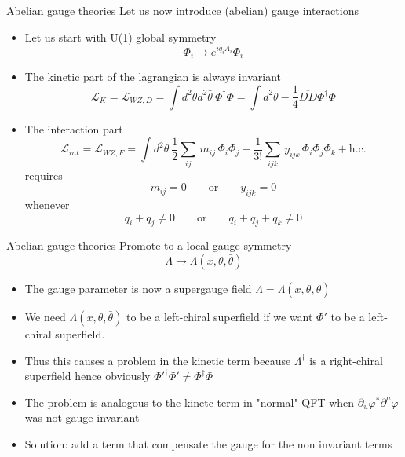 \documentclass[10pt]{beamer}
\begin{document}
\begin{frame}{Abelian gauge theories}
Let us now introduce (abelian) gauge interactions
\begin{itemize} 
    \item Let us start with U(1) global symmetry 
    \begin{equation*}
        \Phi_i \rightarrow e^{iq_i\Lambda_i}\Phi_i
    \end{equation*}
    \item The kinetic part of the lagrangian is always invariant
    \begin{equation*}
        \mathcal{L}_{K} = \mathcal{L}_{WZ,D} = \int d^2\theta d^2 \bar\theta \ \Phi^{\dagger}\Phi = \int d^2\theta -\frac{1}{4} \overline{D D} \Phi^{\dagger}\Phi
    \end{equation*}
    \item The interaction part 
    \begin{equation*}
        \mathcal{L}_{int} = \mathcal{L}_{WZ,F} = \int d^2\theta \ \frac{1}{2} \sum_{ij} \, m_{ij} \, \Phi_i \Phi_j + \frac{1}{3!} \sum_{ijk}  \, y_{ijk} \, \Phi_i \Phi_j \Phi_k + \text{h.c.}
    \end{equation*}
    requires
    \begin{equation*}
        m_{ij} = 0 \qquad \text{or} \qquad y_{ijk} = 0
    \end{equation*}
    whenever
    \begin{equation*}
        q_i + q_j \neq 0 \qquad \text{or} \qquad q_i + q_j + q_k \neq 0
    \end{equation*}
\end{itemize}
\end{frame}

\begin{frame}{Abelian gauge theories}
Promote to a local gauge symmetry
\begin{equation*}
    \Lambda \to \Lambda(x, \theta, \bar\theta)
\end{equation*}
\begin{itemize}
    \item The gauge parameter is now a supergauge field $\Lambda = \Lambda(x, \theta, \bar\theta)$
    \item We need $\Lambda(x, \theta, \bar\theta)$ to be a left-chiral superfield if we want $\Phi'$ to be a left-chiral superfield. \\ 
    \item Thus this causes a problem in the kinetic term because $\Lambda^{\dagger}$ is a right-chiral superfield
    hence obviously $\Phi'^{\dagger}\Phi' \neq \Phi^{\dagger}\Phi$
    \item The problem is analogous to the kinetc term in "normal" QFT when $\partial_u \varphi^* \partial^\mu \varphi$ was not gauge invariant
    \item Solution: add a term that compensate the gauge for the non invariant terms
\end{itemize}
\end{frame}
\end{document}
